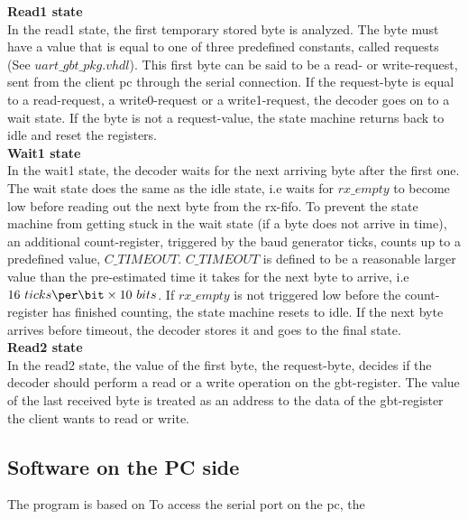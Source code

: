\documentclass[main.tex]{subfiles}
\begin{document}
\textbf{Read1 state}\\
 In the read1 state, the first temporary stored byte is analyzed. The byte must have a value that is equal to one of three predefined constants, called requests (See $uart\_gbt\_pkg.vhdl$). This first byte can be said to be a read- or write-request, sent from the client \gls{pc} through the serial connection. If the request-byte is equal to a read-request, a write0-request or a write1-request, the decoder goes on to a wait state. If the byte is not a request-value, the state machine returns back to idle and reset the registers.\\

  \textbf{Wait1 state}\\
  In the wait1 state, the decoder waits for the next arriving byte after the first one. The wait state does the same as the idle state, i.e waits for $rx\_empty$ to become low before reading out the next byte from the rx-fifo. To prevent the state machine from getting stuck in the wait state (if a byte does not arrive in time), an additional count-register, triggered by the baud generator ticks, counts up to a predefined value, $C\_TIMEOUT$. $C\_TIMEOUT$ is defined to be a reasonable larger value than the pre-estimated time it takes for the next byte to arrive, i.e $16 ~ticks\per\bit \times 10 ~bits$. If $rx\_empty$ is not triggered low before the count-register has finished counting, the state machine resets to idle. If the next byte arrives before timeout, the decoder stores it and goes to the final state.\\

  \textbf{Read2 state}\\
  In the read2 state, the value of the first byte, the request-byte, decides if the decoder should perform a read or a write operation on the gbt-register. The value of the last received byte is treated as an address to the data of the gbt-register the client wants to read or write.  

\subsection{Software on the PC side}
The program is based on 
To access the serial port on the \gls{pc}, the 
\end{document}
